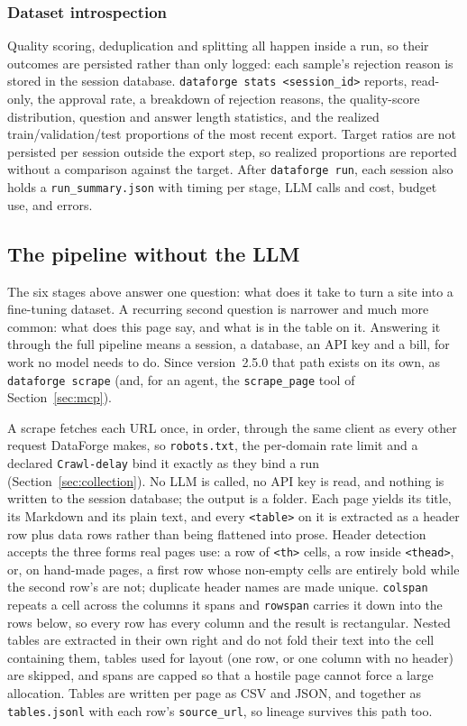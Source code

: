 \documentclass[11pt]{article}
\begin{document}
\subsubsection{Dataset introspection}
\label{sec:introspection}
Quality scoring, deduplication and splitting all happen inside a run, so
their outcomes are persisted rather than only logged: each sample's
rejection reason is stored in the session database. \texttt{dataforge stats
<session\_id>} reports, read-only, the approval rate, a breakdown of
rejection reasons, the quality-score distribution, question and answer
length statistics, and the realized train/validation/test proportions of
the most recent export. Target ratios are not persisted per session
outside the export step, so realized proportions are reported without a
comparison against the target. After \texttt{dataforge run}, each session
also holds a \texttt{run\_summary.json} with timing per stage, LLM calls
and cost, budget use, and errors.

\subsection{The pipeline without the LLM}
\label{sec:nollm}
The six stages above answer one question: what does it take to turn a
site into a fine-tuning dataset. A recurring second question is narrower
and much more common: what does this page say, and what is in the table
on it. Answering it through the full pipeline means a session, a
database, an API key and a bill, for work no model needs to do. Since
version~2.5.0 that path exists on its own, as \texttt{dataforge scrape}
(and, for an agent, the \texttt{scrape\_page} tool of
Section~\ref{sec:mcp}).

A scrape fetches each URL once, in order, through the same client as
every other request DataForge makes, so \texttt{robots.txt}, the
per-domain rate limit and a declared \texttt{Crawl-delay} bind it exactly
as they bind a run (Section~\ref{sec:collection}). No LLM is called, no
API key is read, and nothing is written to the session database; the
output is a folder. Each page yields its title, its Markdown and its
plain text, and every \texttt{<table>} on it is extracted as a header row
plus data rows rather than being flattened into prose. Header detection
accepts the three forms real pages use: a row of \texttt{<th>} cells, a
row inside \texttt{<thead>}, or, on hand-made pages, a first row whose
non-empty cells are entirely bold while the second row's are not;
duplicate header names are made unique. \texttt{colspan} repeats a cell
across the columns it spans and \texttt{rowspan} carries it down into the
rows below, so every row has every column and the result is rectangular.
Nested tables are extracted in their own right and do not fold their text
into the cell containing them, tables used for layout (one row, or one
column with no header) are skipped, and spans are capped so that a
hostile page cannot force a large allocation. Tables are written per page
as CSV and JSON, and together as \texttt{tables.jsonl} with each row's
\texttt{source\_url}, so lineage survives this path too.
\end{document}
